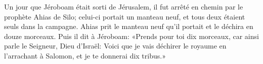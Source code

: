 Un jour que Jéroboam était sorti de Jérusalem,
	il fut arrêté en chemin par le prophète Ahias de Silo;
	celui-ci portait un manteau neuf, et tous deux étaient seuls dans la campagne.
Ahias prit le manteau neuf qu’il portait et le déchira en douze morceaux.
Puis il dit à Jéroboam:
	«Prends pour toi dix morceaux, car ainsi parle le Seigneur, Dieu d’Israël:
	Voici que je vais déchirer le royaume en l’arrachant à Salomon,
	et je te donnerai dix tribus.»
